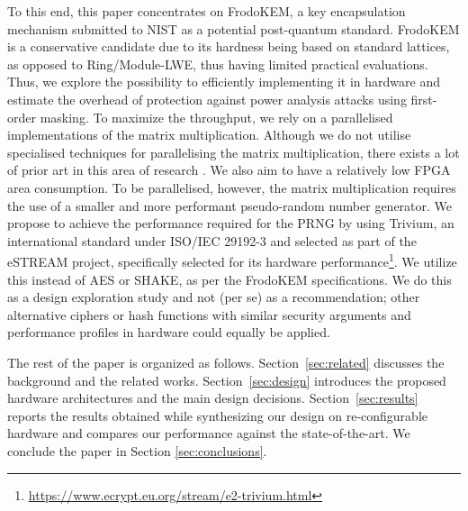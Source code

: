 To this end, this paper concentrates on FrodoKEM, a key encapsulation mechanism submitted to NIST as a potential post-quantum standard. FrodoKEM is a conservative candidate due to its hardness being based on standard lattices, as opposed to Ring/Module-LWE, thus having limited practical evaluations. Thus, we explore the possibility to efficiently implementing it in hardware and estimate the overhead of protection against power analysis attacks using first-order masking. To maximize the throughput, we rely on a parallelised implementations of the matrix multiplication. Although we do not utilise specialised techniques for parallelising the matrix multiplication, there exists a lot of prior art in this area of research \cite{jang2002area,qasim2008proposed}. We also aim to have a relatively low FPGA area consumption. To be parallelised, however, the matrix multiplication requires the use of a smaller and more performant pseudo-random number generator. We propose to achieve the performance required for the PRNG by using Trivium, an international standard under ISO/IEC 29192-3 \cite{ISO} and selected as part of the eSTREAM project, specifically selected for its hardware performance\footnote{\url{https://www.ecrypt.eu.org/stream/e2-trivium.html}}. We utilize this instead of AES or SHAKE, as per the FrodoKEM specifications. We do this as a design exploration study and not (per se) as a recommendation; other alternative ciphers or hash functions with similar security arguments and performance profiles in hardware could equally be applied.

The rest of the paper is organized as follows. Section~\ref{sec:related} discusses the background and the related works. Section~\ref{sec:design} introduces the proposed hardware architectures and the main design decisions. Section~\ref{sec:results} reports the results obtained while synthesizing our design on re-configurable hardware and compares our performance against the state-of-the-art. We conclude the paper in Section \ref{sec:conclusions}.